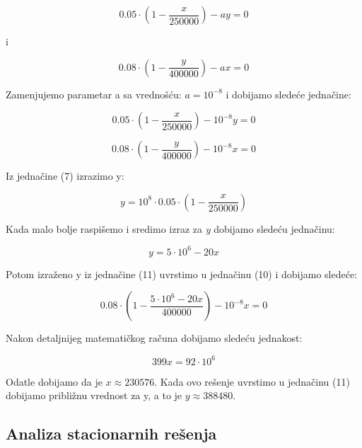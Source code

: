 \documentclass[a4paper]{article}
\begin{document}
{	%
	\newpage
	
	\[
		0.05 \cdot (1 - \frac{x}{250000}) - ay = 0
	\]
	
	i 
	
	\[
		0.08 \cdot (1 - \frac{y}{400000}) - ax = 0
	\]
	
	Zamenjujemo parametar a sa vrednošću: $a = 10^{-8}$ i dobijamo sledeće jednačine:
	
	\begin{equation}
		0.05 \cdot (1 - \frac{x}{250000}) - 10^{-8} y = 0
	\end{equation}

	\begin{equation}
		0.08 \cdot (1 - \frac{y}{400000}) - 10^{-8} x = 0
	\end{equation}


	Iz jednačine (7) izrazimo y:
	
	\[
		y = 10^8 \cdot 0.05 \cdot (1 - \frac{x}{250000})
	\]

	Kada malo bolje raspišemo i sredimo izraz za \textit{y} dobijamo sledeću jednačinu: 
	
	\begin{equation}
		y = 5 \cdot 10^6 - 20x
	\end{equation}

	Potom izraženo y iz jednačine (11) uvrstimo u jednačinu (10) i dobijamo sledeće: 
	
	\[
		0.08 \cdot (1 - \frac{5 \cdot 10^6 - 20x}{400000}) - 10^{-8} x = 0  
	\]
	
	Nakon detaljnijeg matematičkog računa dobijamo sledeću jednakost:
	
	\begin{equation}
		399x = 92 \cdot 10^6
	\end{equation} 

	Odatle dobijamo da je $ x \approx 230576 $. Kada ovo rešenje uvrstimo u jednačinu (11) dobijamo približnu vrednost za y, a to je $ y \approx 388480 $.  
	
	\subsection{Analiza stacionarnih rešenja}
	\label{sec: analia-stacionarnih-resenja}
	
}
\end{document}
